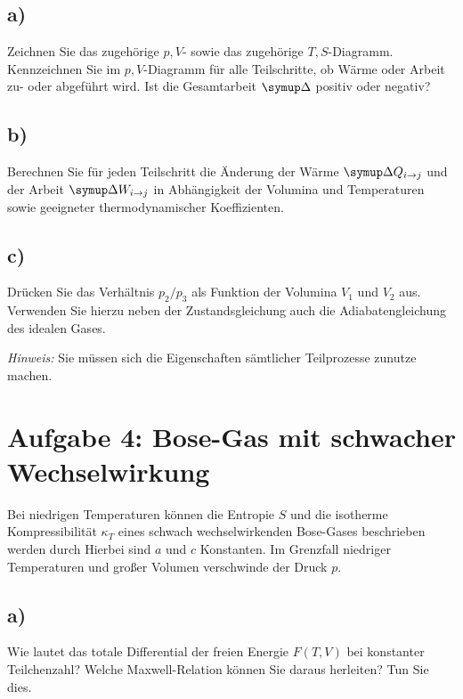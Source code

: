 \subsection{a)}
Zeichnen Sie das zugehörige $p,V$- sowie das zugehörige $T,S$-Diagramm.
Kennzeichnen Sie im $p,V$-Diagramm für alle Teilschritte, ob Wärme oder Arbeit zu- oder abgeführt wird.
Ist die Gesamtarbeit $\symup\Delta$ positiv oder negativ?

\subsection{b)}
Berechnen Sie für jeden Teilschritt die Änderung der Wärme $\symup\Delta Q_{i \to j}$ und der Arbeit $\symup\Delta W_{i \to j}$ in Abhängigkeit der Volumina und Temperaturen sowie geeigneter thermodynamischer Koeffizienten.

\subsection{c)}
Drücken Sie das Verhältnis $p_2 / p_3$ als Funktion der Volumina $V_1$ und $V_2$ aus.
Verwenden Sie hierzu neben der Zustandsgleichung auch die Adiabatengleichung des idealen Gases.

\textit{Hinweis:} Sie müssen sich die Eigenschaften sämtlicher Teilprozesse zunutze machen.

\section{Aufgabe 4: Bose-Gas mit schwacher Wechselwirkung}
Bei niedrigen Temperaturen können die Entropie $S$ und die isotherme Kompressibilität $\kappa_T$ eines schwach wechselwirkenden Bose-Gases beschrieben werden durch
Hierbei sind $a$ und $c$ Konstanten. Im Grenzfall niedriger Temperaturen und großer Volumen verschwinde der Druck $p$.

\subsection{a)}
Wie lautet das totale Differential der freien Energie $F(T,V)$ bei konstanter Teilchenzahl?
Welche Maxwell-Relation können Sie daraus herleiten?
Tun Sie dies.

